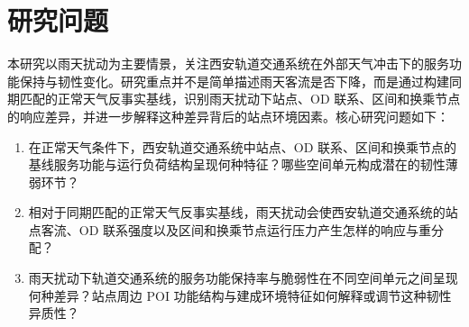 \section{研究问题}

本研究以雨天扰动为主要情景，关注西安轨道交通系统在外部天气冲击下的服务功能保持与韧性变化。研究重点并不是简单描述雨天客流是否下降，而是通过构建同期匹配的正常天气反事实基线，识别雨天扰动下站点、OD 联系、区间和换乘节点的响应差异，并进一步解释这种差异背后的站点环境因素。核心研究问题如下：

\begin{enumerate}
\item 在正常天气条件下，西安轨道交通系统中站点、OD 联系、区间和换乘节点的基线服务功能与运行负荷结构呈现何种特征？哪些空间单元构成潜在的韧性薄弱环节？
\item 相对于同期匹配的正常天气反事实基线，雨天扰动会使西安轨道交通系统的站点客流、OD 联系强度以及区间和换乘节点运行压力产生怎样的响应与重分配？
\item 雨天扰动下轨道交通系统的服务功能保持率与脆弱性在不同空间单元之间呈现何种差异？站点周边 POI 功能结构与建成环境特征如何解释或调节这种韧性异质性？
\end{enumerate}
